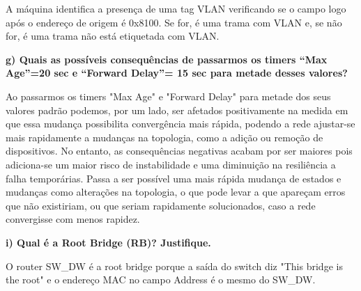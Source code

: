 \documentclass[11pt,english, openright, oneside]{book}
\begin{document}
A máquina identifica a presença de uma tag VLAN verificando se o campo logo após
o endereço de origem é 0x8100. Se for, é uma trama com VLAN e, se não for, é uma
trama não está etiquetada com VLAN.
\vspace{0.8cm}


\pagebreak
\textbf{g) Quais as possíveis consequências de passarmos os timers “Max Age”=20 sec e “Forward Delay”= 15 sec para metade desses valores?}
\vspace{0.2cm}

Ao passarmos os timers "Max Age" e "Forward Delay" para metade dos seus valores
padrão podemos, por um lado, ser afetados positivamente na medida em que essa
mudança possibilita convergência mais rápida, podendo a rede ajustar-se mais
rapidamente a mudanças na topologia, como a adição ou remoção de dispositivos.
No entanto, as consequências negativas acabam por ser maiores pois adiciona-se
um maior risco de instabilidade e uma diminuição na resiliência a falha
temporárias. Passa a ser possível uma mais rápida mudança de estados e mudanças
como alterações na topologia, o que pode levar a que apareçam erros que não
existiriam, ou que seriam rapidamente solucionados, caso a rede convergisse com
menos rapidez.
\vspace{0.8cm}


\textbf{i) Qual é a Root Bridge (RB)? Justifique.}
\label{quest:1i}
\vspace{0.2cm}

O router SW\_DW é a root bridge porque a saída do switch diz "This bridge is the
root" e o endereço MAC no campo Address é o mesmo do SW\_DW.
\end{document}
